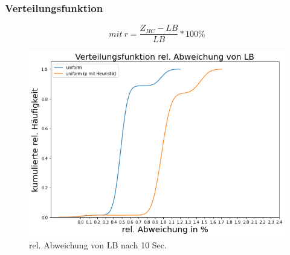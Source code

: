 \documentclass{beamer}
\begin{document}
\begin{frame}

\frametitle{Verteilungsfunktion}

\begin{footnotesize}
\begin{equation}
mit \ r = \frac{Z_{HC}-LB}{LB} * 100\%
\end{equation}
\end{footnotesize}

\begin{figure}[!htbp]
\begin{center}
\includegraphics[scale=0.3]{img/dist2.png}
\end{center}
\caption{rel. Abweichung von LB nach 10 Sec.}
\label{fig:architecture}
\end{figure}



\end{frame}
\end{document}
